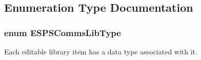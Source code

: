 \subsection{Enumeration Type Documentation}
\hypertarget{group___scope_comms_ga3d928ff358bdf470a2c9881b13e4c1ff}{
\subsubsection[{E\+S\+P\+S\+Comms\+Lib\+Type}]{\setlength{\rightskip}{0pt plus 5cm}enum {\bf E\+S\+P\+S\+Comms\+Lib\+Type}}}\label{group___scope_comms_ga3d928ff358bdf470a2c9881b13e4c1ff}


Each editable library item has a data type associated with it. 



